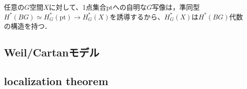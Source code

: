 任意の$G$空間$X$に対して、1点集合$\text{pt}$への自明な$G$写像は，準同型$H^*(BG)\simeq H^*_G(\text{pt})\rightarrow H^*_G(X)$を誘導するから、$H^*_G(X)$は$H^*(BG)$代数の構造を持つ．

\subsection{Weil/Cartanモデル}





\subsection{localization theorem}
